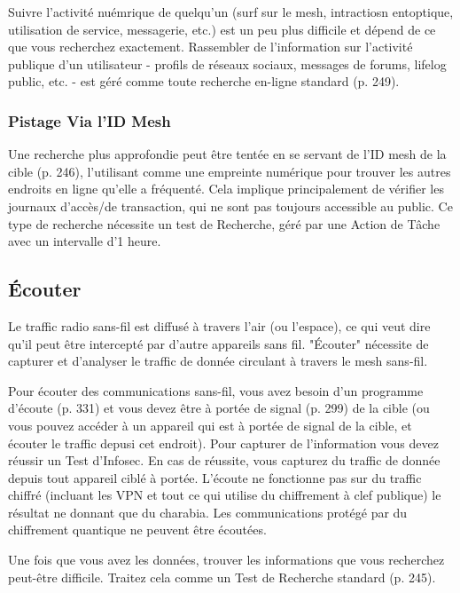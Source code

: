 Suivre l'activité nuémrique de quelqu'un (surf sur le mesh, intractiosn entoptique, utilisation de service, messagerie, etc.) est un peu plus difficile et dépend de ce que vous recherchez exactement. Rassembler de l'information sur l'activité publique d'un utilisateur - profils de réseaux sociaux, messages de forums, lifelog public, etc. - est géré comme toute recherche en-ligne standard (p. 249). 

\subsubsection{Pistage Via l'ID Mesh} 

Une recherche plus approfondie peut être tentée en se servant de l'ID mesh de la cible (p. 246), l'utilisant comme une empreinte numérique pour trouver les autres endroits en ligne qu'elle a fréquenté. Cela implique principalement de vérifier les journaux d'accès/de transaction, qui ne sont pas toujours accessible au public. Ce type de recherche nécessite un test de Recherche, géré par une Action de Tâche avec un intervalle d'1 heure. 

\subsection{Écouter} 

Le traffic radio sans-fil est diffusé à travers l'air (ou l'espace), ce qui veut dire qu'il peut être intercepté par d'autre appareils sans fil. "Écouter" nécessite de capturer et d'analyser le traffic de donnée circulant à travers le mesh sans-fil. 

Pour écouter des communications sans-fil, vous avez besoin d'un programme d'écoute (p. 331) et vous devez être à portée de signal (p. 299) de la cible (ou vous pouvez accéder à un appareil qui est à portée de signal de la cible, et écouter le traffic depusi cet endroit). Pour capturer de l'information vous devez réussir un Test d'Infosec. En cas de réussite, vous capturez du traffic de donnée depuis tout appareil ciblé à portée. L'écoute ne fonctionne pas sur du traffic chiffré (incluant les VPN et tout ce qui utilise du chiffrement à clef publique) le résultat ne donnant que du charabia. Les communications protégé par du chiffrement quantique ne peuvent être écoutées. 

Une fois que vous avez les données, trouver les informations que vous recherchez peut-être difficile. Traitez cela comme un Test de Recherche standard (p. 245). 

